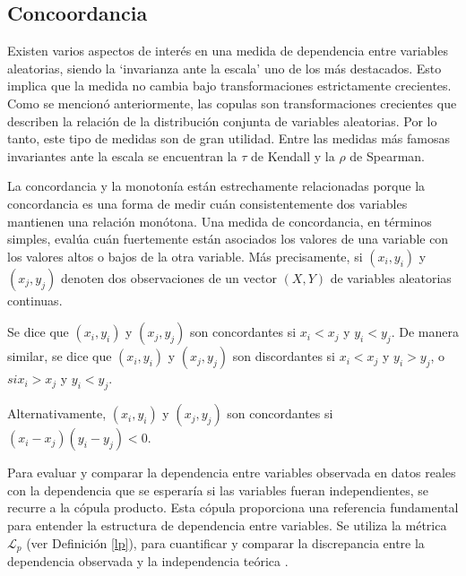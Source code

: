 
\subsection{Concoordancia}

Existen varios aspectos de interés en una medida de dependencia entre variables aleatorias, siendo la `invarianza ante la escala' uno de los más destacados. Esto implica que la medida no cambia bajo transformaciones estrictamente crecientes. Como se mencionó anteriormente, las copulas son transformaciones crecientes que describen la relación de la distribución conjunta de variables aleatorias. Por lo tanto, este tipo de medidas son de gran utilidad. Entre las medidas más famosas invariantes ante la escala se encuentran la $\tau$ de Kendall y la $\rho$ de Spearman.\cite{czadoAnalyzing}

La concordancia y la monotonía están estrechamente relacionadas porque la concordancia es una forma de medir cuán consistentemente dos variables mantienen una relación monótona. Una medida de concordancia, en términos simples, evalúa cuán fuertemente están asociados los valores de una variable con los valores altos o bajos de la otra variable. Más precisamente, si $(x_i, y_i)$ y $(x_j, y_j)$ denoten dos observaciones de un vector $(X, Y)$ de variables aleatorias continuas. 

\begin{defn}[Concoordancia]
    Se dice que $(x_i, y_i)$ y $(x_j, y_j)$ son concordantes si $x_i < x_j$ y $y_i < y_j$. De manera similar, se dice que $(x_i, y_i)$ y $(x_j, y_j)$ son discordantes si $x_i < x_j$ y $y_i > y_j$, o $si x_i > x_j$ y $y_i < y_j$. 
    
    Alternativamente, $(x_i, y_i)$ y $(x_j, y_j)$ son concordantes si $(x_i - x_j)(y_i - y_j) < 0$.
\end{defn}

Para evaluar y comparar la dependencia entre variables observada en datos reales con la dependencia que se esperaría si las variables fueran independientes, se recurre a la cópula producto. Esta cópula proporciona una referencia fundamental para entender la estructura de dependencia entre variables. Se utiliza la métrica $\mathcal{L}_p$ (ver Definición \ref{lp}), para cuantificar y comparar la discrepancia entre la dependencia observada y la independencia teórica \cite{TesisEmanuel}.

